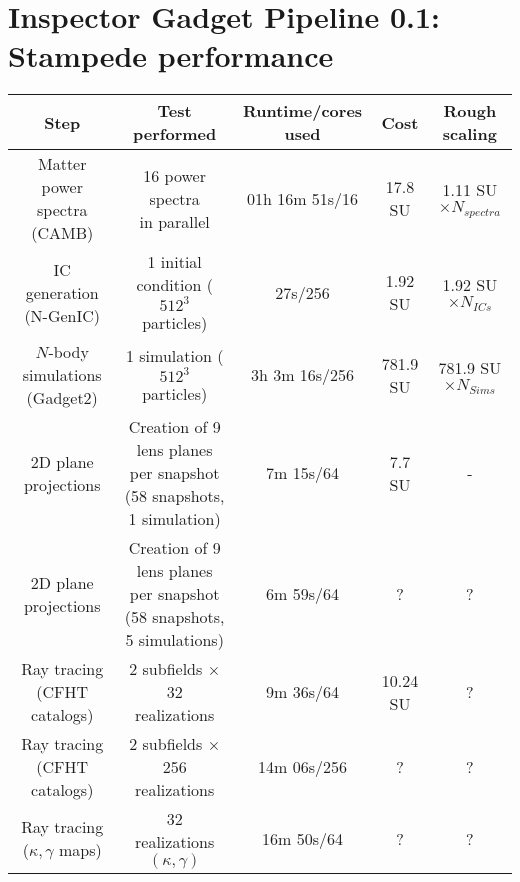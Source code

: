 \documentclass[11pt]{article}
\begin{document}
\section*{Inspector Gadget Pipeline 0.1: Stampede performance}

\begin{table}[h!]
\begin{center}
\begin{tabular}{c|c|c|c|c}
Step & Test performed & Runtime/cores used & Cost & Rough scaling \\ \hline
\pbox{20cm}{Matter power spectra \\ (CAMB)} & \pbox{20cm}{16 power spectra \\ in parallel} & 01h 16m 51s/16 & 17.8 SU & 1.11 SU $\times N_{spectra}$ \\ \hline
\pbox{20cm}{IC generation\\ (N-GenIC)} & \pbox{20cm}{1 initial condition \\ ($512^3$ particles)} & 27s/256 & 1.92 SU & 1.92 SU $\times N_{ICs}$ \\ \hline
\pbox{20cm}{$N$-body simulations\\ (Gadget2)} & \pbox{20cm}{1 simulation \\ ($512^3$ particles)} & 3h 3m 16s/256 & 781.9 SU & 781.9 SU $\times N_{Sims}$ \\ \hline
2D plane projections & \pbox{20cm}{Creation of 9 lens planes \\ per snapshot (58 snapshots,\\ 1 simulation)} & 7m 15s/64 & 7.7 SU & - \\ \hline
2D plane projections & \pbox{20cm}{Creation of 9 lens planes \\ per snapshot (58 snapshots,\\ 5 simulations)} & 6m 59s/64 & ? & ? \\ \hline
\pbox{20cm}{Ray tracing \\(CFHT catalogs)} & 2 subfields $\times$ 32 realizations & 9m 36s/64 & 10.24 SU & ? \\ \hline
\pbox{20cm}{Ray tracing \\(CFHT catalogs)} & 2 subfields $\times$ 256 realizations & 14m 06s/256 & ? & ? \\ \hline
\pbox{20cm}{Ray tracing\\ ($\kappa,\gamma$ maps)} & 32 realizations $(\kappa,\gamma)$ & 16m 50s/64 & ? & ? \\ \hline
\end{tabular}
\end{center}
\end{table}
\end{document}
